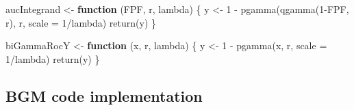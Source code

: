 \documentclass[
]{book}
\newenvironment{Shaded}{\begin{snugshade}}{\end{snugshade}}
\newcommand{\AttributeTok}[1]{\textcolor[rgb]{0.77,0.63,0.00}{#1}}
\newcommand{\ControlFlowTok}[1]{\textcolor[rgb]{0.13,0.29,0.53}{\textbf{#1}}}
\newcommand{\DecValTok}[1]{\textcolor[rgb]{0.00,0.00,0.81}{#1}}
\newcommand{\FunctionTok}[1]{\textcolor[rgb]{0.00,0.00,0.00}{#1}}
\newcommand{\NormalTok}[1]{#1}
\newcommand{\OtherTok}[1]{\textcolor[rgb]{0.56,0.35,0.01}{#1}}
\newcommand{\SpecialCharTok}[1]{\textcolor[rgb]{0.00,0.00,0.00}{#1}}
\begin{document}
\begin{Shaded}
\begin{Highlighting}[]
\NormalTok{aucIntegrand }\OtherTok{\textless{}{-}} \ControlFlowTok{function}\NormalTok{ (FPF, r, lambda) }
\NormalTok{\{}
\NormalTok{  y }\OtherTok{\textless{}{-}} \DecValTok{1} \SpecialCharTok{{-}} \FunctionTok{pgamma}\NormalTok{(}\FunctionTok{qgamma}\NormalTok{(}\DecValTok{1}\SpecialCharTok{{-}}\NormalTok{FPF, r), r, }\AttributeTok{scale =} \DecValTok{1}\SpecialCharTok{/}\NormalTok{lambda)}
  \FunctionTok{return}\NormalTok{(y)  }
\NormalTok{\}}


\NormalTok{biGammaRocY }\OtherTok{\textless{}{-}} \ControlFlowTok{function}\NormalTok{ (x, r, lambda) \{}
\NormalTok{  y }\OtherTok{\textless{}{-}} \DecValTok{1} \SpecialCharTok{{-}} \FunctionTok{pgamma}\NormalTok{(x, r, }\AttributeTok{scale =} \DecValTok{1}\SpecialCharTok{/}\NormalTok{lambda)}
  \FunctionTok{return}\NormalTok{(y)}
\NormalTok{\}}
\end{Highlighting}
\end{Shaded}

\hypertarget{proper-roc-models-bigamma-code}{%
\subsection{BGM code implementation}\label{proper-roc-models-bigamma-code}}
\end{document}
